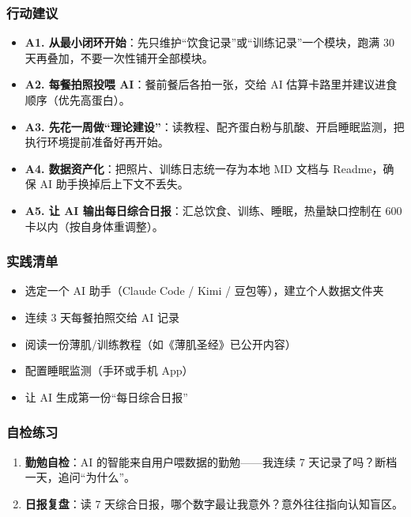\subsubsection{行动建议}

\begin{itemize}
\tightlist
\item
  \textbf{A1.
  从最小闭环开始}：先只维护``饮食记录''或``训练记录''一个模块，跑满 30
  天再叠加，不要一次性铺开全部模块。
\item
  \textbf{A2. 每餐拍照投喂 AI}：餐前餐后各拍一张，交给 AI
  估算卡路里并建议进食顺序（优先高蛋白）。
\item
  \textbf{A3.
  先花一周做``理论建设''}：读教程、配齐蛋白粉与肌酸、开启睡眠监测，把执行环境提前准备好再开始。
\item
  \textbf{A4. 数据资产化}：把照片、训练日志统一存为本地 MD 文档与
  Readme，确保 AI 助手换掉后上下文不丢失。
\item
  \textbf{A5. 让 AI
  输出每日综合日报}：汇总饮食、训练、睡眠，热量缺口控制在 600
  卡以内（按自身体重调整）。
\end{itemize}

\subsubsection{实践清单}

\begin{itemize}
\tightlist
\item[$\square$]
  选定一个 AI 助手（Claude Code / Kimi / 豆包等），建立个人数据文件夹
\item[$\square$]
  连续 3 天每餐拍照交给 AI 记录
\item[$\square$]
  阅读一份薄肌/训练教程（如《薄肌圣经》已公开内容）
\item[$\square$]
  配置睡眠监测（手环或手机 App）
\item[$\square$]
  让 AI 生成第一份``每日综合日报''
\end{itemize}

\subsubsection{自检练习}

\begin{enumerate}
\def\labelenumi{\arabic{enumi}.}
\tightlist
\item
  \textbf{勤勉自检}：AI 的智能来自用户喂数据的勤勉------我连续 7
  天记录了吗？断档一天，追问``为什么''。
\item
  \textbf{日报复盘}：读 7
  天综合日报，哪个数字最让我意外？意外往往指向认知盲区。
\end{enumerate}

